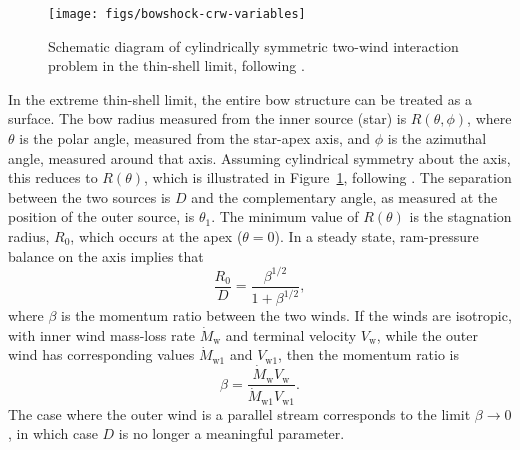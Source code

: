 \documentclass[useAMS, usenatbib, a4paper]{mnras}
\newcommand\w{\ensuremath{\mathrm{w}}}
\newcommand\TODO[1]{%
  \begin{center}
    \framebox{\parbox{0.8\linewidth}{
        \texttt{\footnotesize\color{red} #1}}}
  \end{center}}
\begin{document}
\begin{figure}
  \centering
  \texttt{[image: figs/bowshock-crw-variables]}
  \caption[]{Schematic diagram of cylindrically symmetric two-wind
    interaction problem in the thin-shell limit, following
    \citet{Canto:1996}.}
  \label{fig:crw-schema}
\end{figure}
In the extreme thin-shell limit, the entire bow structure can be
treated as a surface.  The bow radius measured from the inner source
(star) is \(R(\theta, \phi)\), where \(\theta\) is the polar angle, measured from
the star-apex axis, and \(\phi\) is the azimuthal angle, measured around
that axis.  Assuming cylindrical symmetry about the axis, this reduces
to \(R(\theta)\), which is illustrated in Figure~\ref{fig:crw-schema},
following \citet{Canto:1996}.  The separation between the two sources
is \(D\) and the complementary angle, as measured at the position of
the outer source, is \(\theta_1\).  The minimum value of \(R(\theta)\) is the
stagnation radius, \(R_0\), which occurs at the apex (\(\theta = 0\)).  In
a steady state, ram-pressure balance on the axis implies that
\begin{equation}
  \label{eq:stagnation-radius}
  \frac{R_0} {D} = \frac{\beta^{1/2}} {1 + \beta^{1/2}} ,
\end{equation}
where \(\beta\) is the momentum ratio between the two winds.  If the winds
are isotropic, with inner wind mass-loss rate \(\dot{M}_{\w}\) and
terminal velocity \(V_{\w}\), while the outer wind has corresponding
values \(\dot{M}_{\w1}\) and \(V_{\w1}\), then the momentum ratio is
\begin{equation}
  \label{eq:beta-definition}
  \beta = \frac{\dot{M}_{\w} V_{\w}} {\dot{M}_{\w1} V_{\w1}} .
\end{equation}
The case where the outer wind is a parallel stream
\citep{Wilkin:1996a} corresponds to the limit \(\beta \to 0\), in which case
\(D\) is no longer a meaningful parameter.

\end{document}
